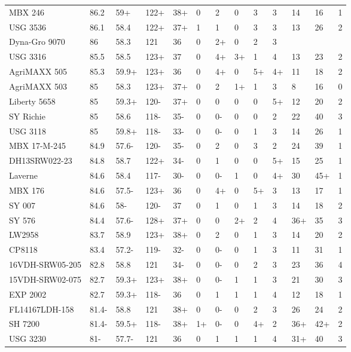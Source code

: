 \documentclass[12pt, letterpaper]{article}
\begin{document}
\begin{landscape}
\begin{ThreePartTable}
\begin{longtable}{lllllllllllll}
  MBX 246 & 86.2 & 59+ & 122+ & 38+ & 0 & 2 & 0 & 3 & 3 & 14 & 16 & 1 \\ 
  USG 3536 & 86.1 & 58.4 & 122+ & 37+ & 1 & 1 & 0 & 3 & 3 & 13 & 26 & 2 \\ 
  Dyna-Gro 9070 & 86 & 58.3 & 121 & 36 & 0 & 2+ & 0 & 2 & 3 &  &  &  \\ 
  USG 3316 & 85.5 & 58.5 & 123+ & 37 & 0 & 4+ & 3+ & 1 & 4 & 13 & 23 & 2 \\ 
  AgriMAXX 505 & 85.3 & 59.9+ & 123+ & 36 & 0 & 4+ & 0 & 5+ & 4+ & 11 & 18 & 2 \\ 
  AgriMAXX 503 & 85 & 58.3 & 123+ & 37+ & 0 & 2 & 1+ & 1 & 3 & 8 & 16 & 0 \\ 
  Liberty 5658 & 85 & 59.3+ & 120- & 37+ & 0 & 0 & 0 & 0 & 5+ & 12 & 20 & 2 \\ 
  SY Richie & 85 & 58.6 & 118- & 35- & 0 & 0- & 0 & 0 & 2 & 22 & 40 & 3 \\ 
  USG 3118 & 85 & 59.8+ & 118- & 33- & 0 & 0- & 0 & 1 & 3 & 14 & 26 & 1 \\ 
  MBX 17-M-245 & 84.9 & 57.6- & 120- & 35- & 0 & 2 & 0 & 3 & 2 & 24 & 39 & 1 \\ 
  DH13SRW022-23 & 84.8 & 58.7 & 122+ & 34- & 0 & 1 & 0 & 0 & 5+ & 15 & 25 & 1 \\ 
  Laverne & 84.6 & 58.4 & 117- & 30- & 0 & 0- & 1 & 0 & 4+ & 30 & 45+ & 1 \\ 
  MBX 176 & 84.6 & 57.5- & 123+ & 36 & 0 & 4+ & 0 & 5+ & 3 & 13 & 17 & 1 \\ 
  SY 007 & 84.6 & 58- & 120- & 37 & 0 & 1 & 0 & 1 & 3 & 14 & 18 & 2 \\ 
  SY 576 & 84.4 & 57.6- & 128+ & 37+ & 0 & 0 & 2+ & 2 & 4 & 36+ & 35 & 3 \\ 
  LW2958 & 83.7 & 58.9 & 123+ & 38+ & 0 & 2 & 0 & 1 & 3 & 14 & 20 & 2 \\ 
  CP8118 & 83.4 & 57.2- & 119- & 32- & 0 & 0- & 0 & 1 & 3 & 11 & 31 & 1 \\ 
  16VDH-SRW05-205 & 82.8 & 58.8 & 121 & 34- & 0 & 0- & 0 & 2 & 3 & 23 & 36 & 4 \\ 
  15VDH-SRW02-075 & 82.7 & 59.3+ & 123+ & 38+ & 0 & 0- & 1 & 1 & 3 & 21 & 30 & 3 \\ 
  EXP 2002 & 82.7 & 59.3+ & 118- & 36 & 0 & 1 & 1 & 1 & 4 & 12 & 18 & 1 \\ 
  FL14167LDH-158 & 81.4- & 58.8 & 121 & 38+ & 0 & 0- & 0 & 2 & 3 & 26 & 24 & 2 \\ 
  SH 7200 & 81.4- & 59.5+ & 118- & 38+ & 1+ & 0- & 0 & 4+ & 2 & 36+ & 42+ & 2 \\ 
  USG 3230 & 81- & 57.7- & 121 & 36 & 0 & 1 & 1 & 1 & 4 & 31+ & 40 & 3 \\ 

\end{longtable}
\end{ThreePartTable}
\end{landscape}
\end{document}
